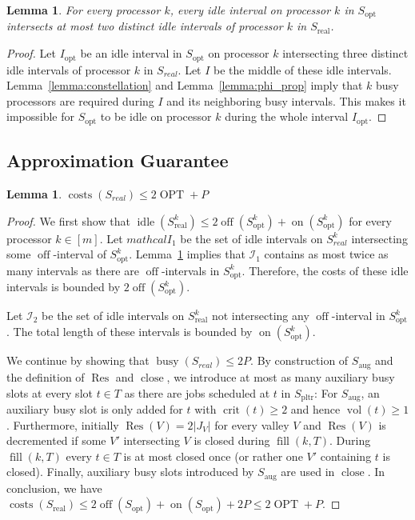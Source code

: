 \documentclass[a4paper]{article}
\DeclareMathOperator{\on}{on}
\DeclareMathOperator{\off}{off}
\DeclareMathOperator{\idle}{idle}
\DeclareMathOperator{\busy}{busy}
\DeclareMathOperator{\costs}{costs}
\DeclareMathOperator{\OPT}{OPT}
\DeclareMathOperator{\opt}{opt}
\DeclareMathOperator{\pltr}{pltr}
\DeclareMathOperator{\aug}{aug}
\DeclareMathOperator{\real}{real}
\DeclareMathOperator{\vol}{vol}
\DeclareMathOperator{\crit}{crit}
\DeclareMathOperator{\fillop}{fill}
\DeclareMathOperator{\close}{close}
\DeclareMathOperator{\res}{Res}
\newtheorem{lemma}[theorem]{Lemma}
\begin{document}
\begin{lemma}\label{lemma:intersection}
  For every processor $k$, every idle interval on processor $k$ in $S_{\opt}$ intersects at most two distinct idle intervals of processor $k$ in $S_{\real}$.
\end{lemma}
\begin{proof}
  Let $I_{\opt}$ be an idle interval in $S_{\opt}$ on processor $k$ intersecting three distinct idle intervals of processor $k$ in $S_{real}$.
  Let $I$ be the middle of these idle intervals.
  Lemma~\ref{lemma:constellation} and Lemma~\ref{lemma:phi_prop} imply that $k$ busy processors are required during $I$ and its neighboring busy intervals.
  This makes it impossible for $S_{\opt}$ to be idle on processor $k$ during the whole interval $I_{\opt}$.
\end{proof}

\subsection{Approximation Guarantee}
\begin{lemma}\label{lemma:costs_s_real}
  $\costs(S_{real}) \leq 2 \OPT + P$
\end{lemma}
\begin{proof}
  We first show that $\idle(S^k_{\real}) \leq 2 \off(S^k_{\opt}) + \on(S^k_{\opt})$ for every processor $k \in [m]$.
  Let $mathcal{I}_1$ be the set of idle intervals on $S^k_{real}$ intersecting some $\off$-interval of $S^k_{\opt}$.
  Lemma~\ref{lemma:intersection} implies that $\mathcal{I}_1$ contains as most twice as many intervals as there are $\off$-intervals in $S^k_{\opt}$.
  Therefore, the costs of these idle intervals is bounded by $2 \off(S^k_{\opt})$.

  Let $\mathcal{I}_2$ be the set of idle intervals on $S^k_{\real}$ not intersecting any $\off$-interval in $S^k_{\opt}$.
  The total length of these intervals is bounded by $\on(S^k_{\opt})$.

  We continue by showing that $\busy(S_{real}) \leq 2 P$.
  By construction of $S_{\aug}$ and the definition of $\res$ and $\close$, we introduce at most as many auxiliary busy slots at every slot $t \in T$ as there are jobs scheduled at $t$ in $S_{\pltr}$:
  For $S_{\aug}$, an auxiliary busy slot is only added for $t$ with $\crit(t) \geq 2$ and hence $\vol(t) \geq 1$.
  Furthermore, initially $\res(V) = 2 |J_V|$ for every valley $V$ and $\res(V)$ is decremented if some $V'$ intersecting $V$ is closed during $\fillop(k, T)$.
  During $\fillop(k, T)$ every $t \in T$ is at most closed once (or rather one $V'$ containing $t$ is closed).
  Finally, auxiliary busy slots introduced by $S_{\aug}$ are used in $\close$.
  In conclusion, we have $\costs(S_{\real}) \leq 2 \off(S_{\opt}) + \on(S_{\opt}) + 2 P \leq 2 \OPT + P$.
\end{proof}
\end{document}
